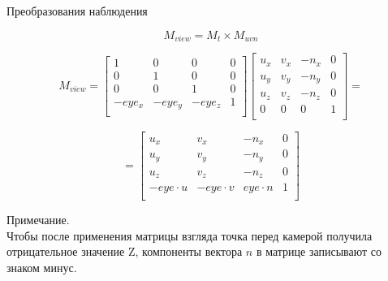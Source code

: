 \documentclass{beamer}
\begin{document}
	\begin{frame}{Преобразования наблюдения}

		\[
			M_{view} = M_{t} \times M_{uvn}
	 \]

	 \[
		 M_{view} = 
		 \begin{bmatrix}
			 1 & 0 & 0 & 0 \\
			 0 & 1 & 0 & 0 \\
			 0 & 0 & 1 & 0 \\
			 -eye_x & -eye_y & -eye_z & 1 \\
		 \end{bmatrix}	
		 \begin{bmatrix}
			 u_x & v_x & -n_x & 0 \\
			 u_y & v_y & -n_y & 0 \\
			 u_z & v_z & -n_z & 0 \\
			 0 & 0 & 0 & 1 \\
		 \end{bmatrix}	
		 =
	 \]

	 \[
		 =
		 \begin{bmatrix}
			u_x & v_x & -n_x & 0 \\
			u_y & v_y & -n_y & 0 \\
			u_z & v_z & -n_z & 0 \\
			- eye \cdot u & -eye \cdot v & eye \cdot n & 1 \\
		 \end{bmatrix}	
	 \]

	 
	 Примечание. \\
	 Чтобы после применения матрицы взгляда точка перед камерой получила отрицательное значение Z, 
	 компоненты вектора $n$ в матрице записывают со знаком минус.

	\end{frame}
\end{document}
